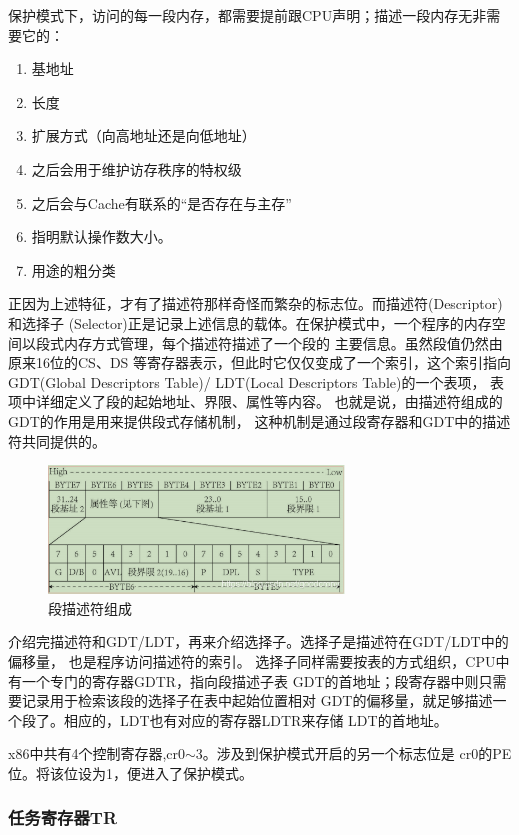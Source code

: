 \documentclass[12pt,a4paper,UTF8]{ctexart}
\begin{document}
保护模式下，访问的每一段内存，都需要提前跟CPU声明；描述一段内存无非需要它的：

\begin{enumerate}
\item 基地址
\item 长度
\item 扩展方式（向高地址还是向低地址）
\item 之后会用于维护访存秩序的特权级
\item 之后会与Cache有联系的“是否存在与主存”
\item 指明默认操作数大小。
\item 用途的粗分类
\end{enumerate}

正因为上述特征，才有了描述符那样奇怪而繁杂的标志位。而描述符(Descriptor)和选择子
(Selector)正是记录上述信息的载体。在保护模式中，一个程序的内存空间以段式内存方式管理，每个描述符描述了一个段的
主要信息。虽然段值仍然由原来16位的CS、DS
等寄存器表示，但此时它仅仅变成了一个索引，这个索引指向GDT(Global Descriptors Table)/
LDT(Local Descriptors Table)的一个表项，
表项中详细定义了段的起始地址、界限、属性等内容。
也就是说，由描述符组成的GDT的作用是用来提供段式存储机制，
这种机制是通过段寄存器和GDT中的描述符共同提供的。

\begin{figure}[htbp]
\centering
\includegraphics[width=0.7\textwidth]{figs/Descriptor.png}
\caption{段描述符组成}
\label{fig:Descriptor}
\end{figure}

介绍完描述符和GDT/LDT，再来介绍选择子。选择子是描述符在GDT/LDT中的偏移量，
也是程序访问描述符的索引。
选择子同样需要按表的方式组织，CPU中有一个专门的寄存器GDTR，指向段描述子表
GDT的首地址；段寄存器中则只需要记录用于检索该段的选择子在表中起始位置相对
GDT的偏移量，就足够描述一个段了。相应的，LDT也有对应的寄存器LDTR来存储
LDT的首地址。

x86中共有4个控制寄存器,cr0$\sim$3。涉及到保护模式开启的另一个标志位是
cr0的PE位。将该位设为1，便进入了保护模式。

\subsubsection*{任务寄存器TR}
\end{document}

